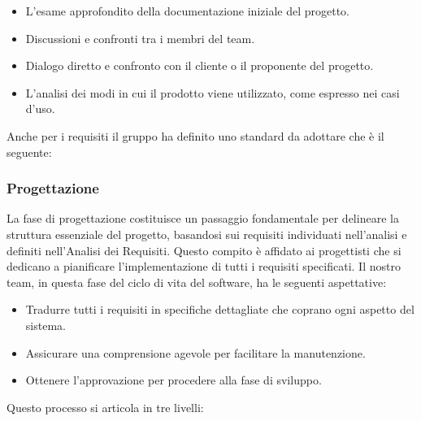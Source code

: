 \documentclass{article}
\begin{document}
\begin{itemize}
    \item L'esame approfondito della documentazione iniziale del progetto.
    \item Discussioni e confronti tra i membri del team.
    \item Dialogo diretto e confronto con il cliente o il proponente del progetto.
    \item L'analisi dei modi in cui il prodotto viene utilizzato, come espresso nei casi d'uso.
\end{itemize}
Anche per i requisiti il gruppo ha definito uno standard da adottare che è il seguente:
\begin{center}
    \textbf{}
\end{center}
\subsubsection{Progettazione}
La fase di progettazione costituisce un passaggio fondamentale per delineare la struttura essenziale del progetto, basandosi sui requisiti individuati nell'analisi e definiti nell'Analisi dei Requisiti. Questo compito è affidato ai progettisti che si dedicano a pianificare l'implementazione di tutti i requisiti specificati. Il nostro team, in questa fase del ciclo di vita del software, ha le seguenti aspettative:

\begin{itemize}
    \item Tradurre tutti i requisiti in specifiche dettagliate che coprano ogni aspetto del sistema.
    \item Assicurare una comprensione agevole per facilitare la manutenzione.
    \item Ottenere l'approvazione per procedere alla fase di sviluppo.
\end{itemize}

Questo processo si articola in tre livelli:
\end{document}
